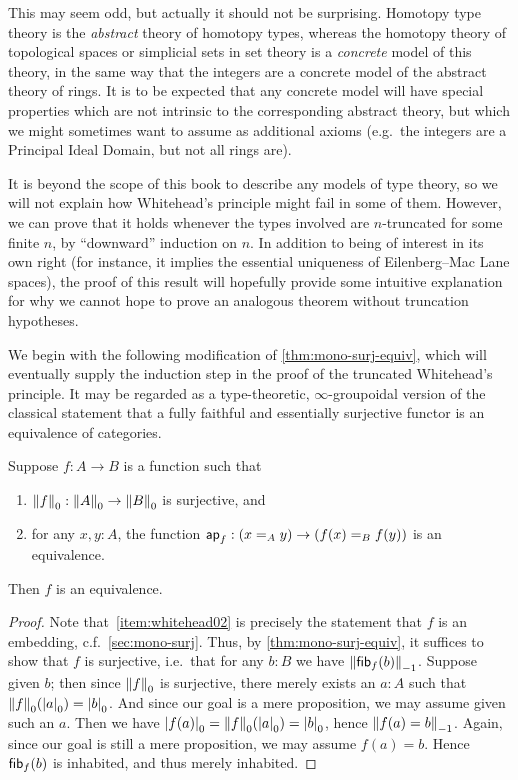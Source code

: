 This may seem odd, but actually it should not be surprising.
Homotopy type theory is the \emph{abstract} theory of homotopy types, whereas the homotopy theory of topological spaces or simplicial sets in set theory is a \emph{concrete} model of this theory, in the same way that the integers are a concrete model of the abstract theory of rings.
It is to be expected that any concrete model will have special properties which are not intrinsic to the corresponding abstract theory, but which we might sometimes want to assume as additional axioms (e.g.\ the integers are a Principal Ideal Domain, but not all rings are).

It is beyond the scope of this book to describe any models of type theory, so we will not explain how Whitehead's principle might fail in some of them.
However, we can prove that it holds whenever the types involved are $n$-truncated for some finite $n$, by ``downward'' induction on $n$.
In addition to being of interest in its own right (for instance, it implies the essential uniqueness of Eilenberg--Mac Lane spaces), the proof of this result will hopefully provide some intuitive explanation for why we cannot hope to prove an analogous theorem without truncation hypotheses.

We begin with the following modification of \cref{thm:mono-surj-equiv}, which will eventually supply the induction step in the proof of the truncated Whitehead's principle.
It may be regarded as a type-theoretic, $\infty$-group\-oid\-al version of the classical statement that a fully faithful and essentially surjective functor is an equivalence of categories.

\begin{thm}\label{thm:whitehead0}
  Suppose $f:A\to B$ is a function such that
  \begin{enumerate}
  \item $\trunc0 f : \trunc0 A \to \trunc0 B$ is surjective, and\label{item:whitehead01}
  \item for any $x,y:A$, the function $\apfunc f : (\id[A]xy) \to (\id[B]{f(x)}{f(y)})$ is an equivalence.\label{item:whitehead02}
  \end{enumerate}
  Then $f$ is an equivalence.
\end{thm}
\begin{proof}
  Note that~\ref{item:whitehead02} is precisely the statement that $f$ is an embedding, c.f.~\cref{sec:mono-surj}.
  Thus, by \cref{thm:mono-surj-equiv}, it suffices to show that $f$ is surjective, i.e.\ that for any $b:B$ we have $\trunc{-1}{\hfib f b}$.
  Suppose given $b$; then since $\trunc0 f$ is surjective, there merely exists an $a:A$ such that $\trunc 0 f(\tproj0a) = \tproj0b$.
  And since our goal is a mere proposition, we may assume given such an $a$.
  Then we have $\tproj0{f(a)} = \trunc 0 f(\tproj0a) =\tproj0b$, hence $\trunc{-1}{f(a)=b}$.
  Again, since our goal is still a mere proposition, we may assume $f(a)=b$.
  Hence $\hfib f b$ is inhabited, and thus merely inhabited.
\end{proof}

